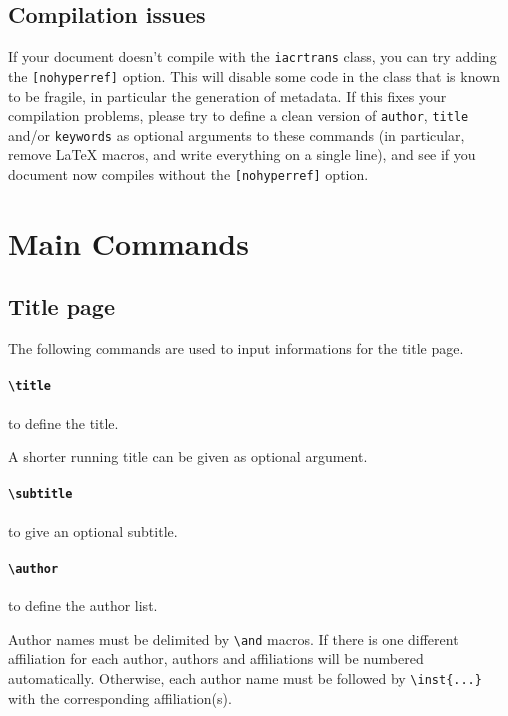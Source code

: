 \documentclass[preprint]{iacrtrans}
\begin{document}
\subsection{Compilation issues}

If your document doesn't compile with the \texttt{iacrtrans} class,
you can try adding the \texttt{[nohyperref]} option.  This will
disable some code in the class that is known to be fragile, in
particular the generation of metadata.  If this fixes your compilation
problems, please try to define a clean version of \texttt{author},
\texttt{title} and/or \texttt{keywords} as optional arguments to
these commands (in particular, remove \LaTeX{}  macros, and write
everything on a single line), and see if you document now compiles
without the \texttt{[nohyperref]} option.

\section{Main Commands}

\subsection{Title page}

The following commands are used to input informations for the title page.

\paragraph{\texttt{\textbackslash title}} to define the title.

A shorter running title can be given as optional argument.

\paragraph{\texttt{\textbackslash subtitle}} to give an optional
subtitle.

\paragraph{\texttt{\textbackslash author}} to define the author list.

Author names must be delimited by \verb+\and+ macros.  If there is one
different affiliation for each author, authors and affiliations will be
numbered automatically.  Otherwise, each author name must be followed by
\verb+\inst{...}+ with the corresponding affiliation(s).
\end{document}
